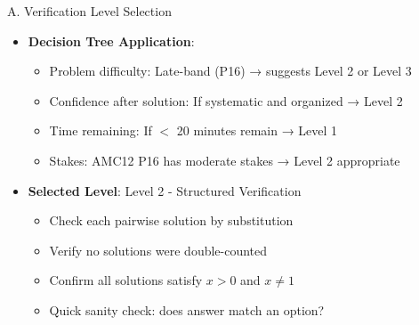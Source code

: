 \documentclass[12pt]{article}
\begin{document}
\begin{verificationbox}{A. Verification Level Selection}
\begin{itemize}[leftmargin=*]
    \item \textbf{Decision Tree Application}:
    \begin{itemize}
        \item Problem difficulty: Late-band (P16) → suggests Level 2 or Level 3
        \item Confidence after solution: If systematic and organized → Level 2
        \item Time remaining: If $<$ 20 minutes remain → Level 1
        \item Stakes: AMC12 P16 has moderate stakes → Level 2 appropriate
    \end{itemize}
    
    \item \textbf{Selected Level}: Level 2 - Structured Verification
    \begin{itemize}
        \item Check each pairwise solution by substitution
        \item Verify no solutions were double-counted
        \item Confirm all solutions satisfy $x > 0$ and $x \neq 1$
        \item Quick sanity check: does answer match an option?
    \end{itemize}
\end{itemize}
\end{verificationbox}
\end{document}
